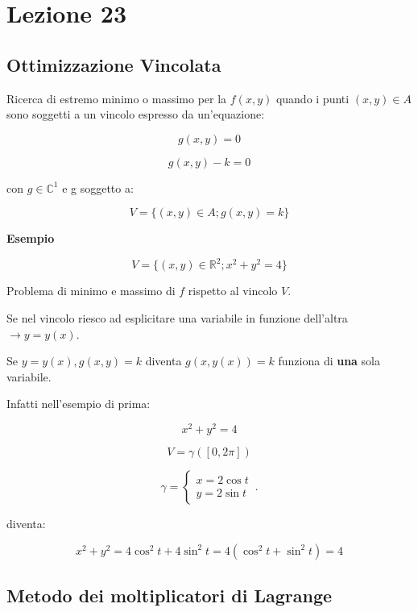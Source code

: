 \documentclass[../appunti-analisi.tex]{subfiles}
\begin{document}
\section{Lezione 23}

\subsection{Ottimizzazione Vincolata}

Ricerca di estremo minimo o massimo per la $f(x,y)$ quando i punti $(x,y) \in A$ sono soggetti a un vincolo espresso da un'equazione:

\[
    g(x,y) = 0
\]

\[
    g(x,y) -k = 0
\]

con $g \in \mathbb{C}^{1}$ e g soggetto a:

\[
    V= \{(x,y) \in A; g(x,y) =k\}
\]

\textbf{Esempio} 

\[
    V = \{(x,y) \in \mathbb{R}^{2}; x^{2}+y^{2}=4\}
\]

\begin{center}
\end{center}

Problema di minimo e massimo di $f$ rispetto al vincolo $V$.

Se nel vincolo riesco ad esplicitare una variabile in funzione dell'altra $\rightarrow y=y(x)$.

Se $y=y(x),g(x,y) = k$ diventa $g(x,y(x))=k$ funziona di \textbf{una} sola variabile.

Infatti nell'esempio di prima:

\[
    x^{2}+y^{2} = 4
\]

\[
    V = \gamma([0,2\pi])
\]

\[
    \gamma =
        \begin{cases}
            x=2 \cos t\\
               y= 2 \sin t
        \end{cases}\,.
\]

diventa:

\[
    x^{2}+y^{2} = 4 \cos ^{2} t + 4 \sin ^{2} t = 4 ( \cos ^{2} t + \sin ^{2} t) =4
\]

\subsection{Metodo dei moltiplicatori di Lagrange}
\end{document}
